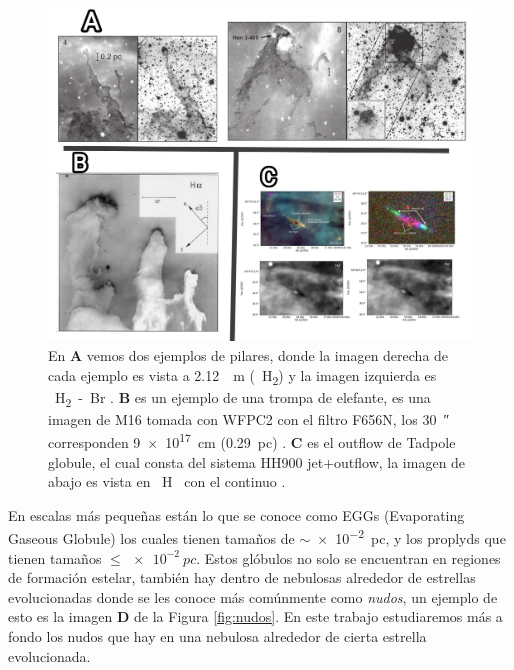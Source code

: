 \documentclass{book}
\begin{document}
\begin{figure}[htb]
    \centering
    \includegraphics[width=1 \textwidth]{images Chapter 1/C1_Pillars.jpg}
    \caption{En \textbf{A} vemos dos ejemplos de pilares, donde la
      imagen derecha de cada ejemplo es vista a \SI{2.12}{\mu m}
      (\SI{}{H_2}) y la imagen izquierda es \SI{}{H_2-Br_{\gamma}}
      \citep{Hartigan:2015}. \textbf{B} es un ejemplo de una trompa de
      elefante, es una imagen de M16 tomada con WFPC2 con el filtro
      F656N, los \SI{30}{\arcsecond} corresponden \SI{9e17}{cm}
      (\SI{0.29}{pc}) \citep{JJHester:1996}. \textbf{C} es el outflow
      de Tadpole globule, el cual consta del sistema HH900
      jet+outflow, la imagen de abajo es vista en \SI{}{H\alpha} con el
      continuo \citep{MeganReiter:2019}. }
    \label{fig:Pillars}
\end{figure}

En escalas más pequeñas están lo que se conoce como EGGs (Evaporating
Gaseous Globule) los cuales tienen tamaños de $\sim$\SI{e-2}{pc}, y los
proplyds que tienen tamaños $\le\SI{e-2}{pc}$. Estos glóbulos no solo se
encuentran en regiones de formación estelar, también hay dentro de
nebulosas alrededor de estrellas evolucionadas donde se les conoce más
comúnmente como \textit{nudos}, un ejemplo de esto es la imagen
\textbf{D} de la Figura \ref{fig:nudos}. En este trabajo estudiaremos
más a fondo los nudos que hay en una nebulosa alrededor de cierta
estrella evolucionada.
\end{document}
